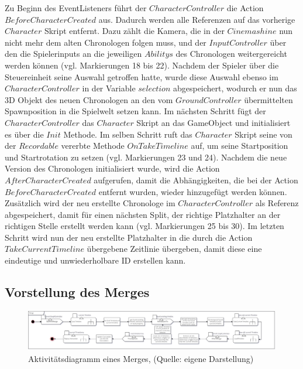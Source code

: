 Zu Beginn des EventListeners führt der $CharacterController$ die Action \\ $BeforeCharacterCreated$ aus. Dadurch werden alle Referenzen auf das vorherige $Character$ Skript entfernt. Dazu zählt die Kamera, die in der $Cinemashine$ nun nicht mehr dem alten Chronologen folgen muss, und der $InputController$ über den die Spielerinputs an die jeweiligen $Abilitys$ des Chronologen weitergereicht werden können (vgl. Markierungen 18 bis 22). Nachdem der Spieler über die Steuereinheit seine Auswahl getroffen hatte, wurde diese Auswahl ebenso im $CharacterController$ in der Variable $selection$ abgespeichert, wodurch er nun das \ac{3D} Objekt des neuen Chronologen an den vom $GroundController$ übermittelten Spawnposition in die Spielwelt setzen kann. Im nächsten Schritt fügt der $CharacterController$ das $Character$ Skript an das GameObject und initialisiert es über die $Init$ Methode. Im selben Schritt ruft das $Character$ Skript seine von der $Recordable$ vererbte Methode $OnTakeTimeline$ auf, um seine Startposition und Startrotation zu setzen (vgl. Markierungen 23 und 24). Nachdem die neue Version des Chronologen initialisiert wurde, wird die Action $AfterCharacterCreated$ aufgerufen, damit die Abhängigkeiten, die bei der Action $BeforeCharacterCreated$ entfernt wurden, wieder hinzugefügt werden können. Zusätzlich wird der neu erstellte Chronologe im $CharacterController$ als Referenz abgespeichert, damit für einen nächsten Split, der richtige Platzhalter an der richtigen Stelle erstellt werden kann (vgl. Markierungen 25 bis 30). Im letzten Schritt wird nun der neu erstellte Platzhalter in die durch die Action $TakeCurrentTimeline$ übergebene Zeitlinie übergeben, damit diese eine eindeutige und unwiederholbare \ac{ID} erstellen kann.

\subsection{Vorstellung des Merges}\label{sec:merge_prototype}

\begin{figure}[ht]
\centering
\includegraphics[width=1\linewidth]{content/pictures/Merge_uml.jpg}
\caption{Aktivitätsdiagramm eines Merges, (Quelle: eigene Darstellung)}
\label{fig:merge-uml}
\end{figure}

